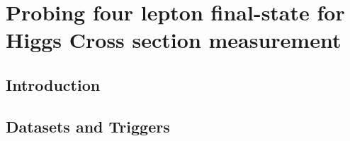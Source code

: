 \documentclass[
12pt, %
english, %
singlespacing, %
liststotoc, %
headsepline, %
]{MastersDoctoralThesis} %
\begin{document}
\chapter{Probing four lepton final-state for Higgs Cross section measurement}\label{Chapter4}
  \section{Introduction}\label{sec:Introduction}
\section{Datasets and Triggers}\label{sec:Datasets}
    
    
\end{document}
